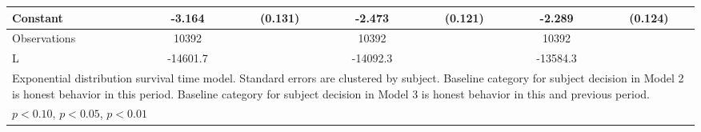 {\begin{tabular}{l*{3}{cc}}
Constant        &   -3.164\sym{***}&  (0.131)&   -2.473\sym{***}&  (0.121)&   -2.289\sym{***}&  (0.124)\\
\hline
Observations    &    10392         &         &    10392         &         &    10392         &         \\
L               & -14601.7         &         & -14092.3         &         & -13584.3         &         \\
\hline\hline
\multicolumn{7}{l}{\footnotesize Exponential distribution survival time model. Standard errors are clustered by subject. Baseline category for subject decision in Model 2 is honest behavior in this period. Baseline category for subject decision in Model 3 is honest behavior in this and previous period.}\\
\multicolumn{7}{l}{\footnotesize \sym{*} \(p<0.10\), \sym{**} \(p<0.05\), \sym{***} \(p<0.01\)}\\
\end{tabular}
}
